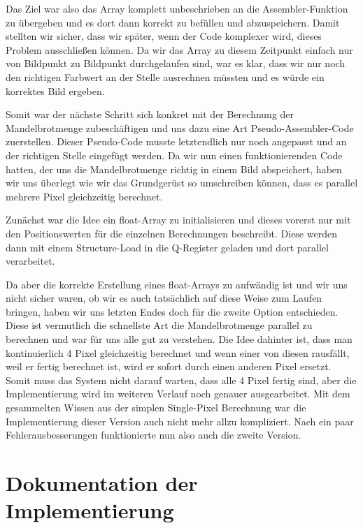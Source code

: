 \documentclass[11pt]{scrartcl}
\begin{document}
Das Ziel war also das Array komplett unbeschrieben an die Assembler-Funktion zu übergeben und es dort dann korrekt zu befüllen und abzuspeichern.
Damit stellten wir sicher, dass wir später, wenn der Code komplexer wird, dieses Problem ausschließen können.
Da wir das Array zu diesem Zeitpunkt einfach nur von Bildpunkt zu Bildpunkt durchgelaufen sind, war es klar, dass wir nur noch den richtigen Farbwert an der Stelle ausrechnen müssten und es würde ein korrektes Bild ergeben.

Somit war der nächste Schritt sich konkret mit der Berechnung der Mandelbrotmenge zubeschäftigen und uns dazu eine Art Pseudo-Assembler-Code zuerstellen.
Dieser Pseudo-Code musste letztendlich nur noch angepasst und an der richtigen Stelle eingefügt werden.
Da wir nun einen funktionierenden Code hatten, der uns die Mandelbrotmenge richtig in einem Bild abspeichert, haben wir uns überlegt wie wir das Grundgerüst so umschreiben können, dass es parallel mehrere Pixel gleichzeitig berechnet.

Zunächst war die Idee ein float-Array zu initialisieren und dieses vorerst nur mit den Positionswerten für die einzelnen Berechnungen beschreibt.
Diese werden dann mit einem Structure-Load in die Q-Register geladen und dort parallel verarbeitet.

Da aber die korrekte Erstellung eines float-Arrays zu aufwändig ist und wir uns nicht sicher waren, ob wir es auch tatsächlich auf diese Weise zum Laufen bringen,
haben wir uns letzten Endes doch für die zweite Option entschieden.
Diese ist vermutlich die schnellste Art die Mandelbrotmenge parallel zu berechnen und war für uns alle gut zu verstehen.
Die Idee dahinter ist, dass man kontinuierlich 4 Pixel gleichzeitig berechnet und wenn einer von diesen rausfällt, weil er fertig berechnet ist, wird er sofort durch einen anderen Pixel ersetzt.
Somit muss das System nicht darauf warten, dass alle 4 Pixel fertig sind, aber die Implementierung wird im weiteren Verlauf noch genauer ausgearbeitet.
Mit dem gesammelten Wissen aus der simplen Single-Pixel Berechnung war die Implementierung dieser Version auch nicht mehr allzu kompliziert.
Nach ein paar Fehlerausbesserungen funktionierte nun also auch die zweite Version.



\pagebreak
\section{Dokumentation der Implementierung}
\end{document}
